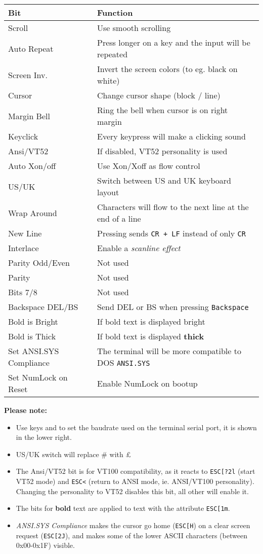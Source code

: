 \begin{tabular}{p{8em} | p{}}
\hline
\textbf{Bit}	& \textbf{Function} \\
\hline
Scroll			& Use smooth scrolling \\
Auto Repeat		& Press longer on a key and the input will be repeated \\
Screen Inv.		& Invert the screen colors (to eg. black on white) \\
Cursor			& Change cursor shape (block / line) \\
\hline
Margin Bell		& Ring the bell when cursor is on right margin \\
Keyclick		& Every keypress will make a clicking sound \\
Ansi/VT52		& If disabled, VT52 personality is used \\
Auto Xon/off	& Use Xon/Xoff as flow control \\
\hline
US/UK			& Switch between US and UK keyboard layout \\
Wrap Around		& Characters will flow to the next line at the end of a line \\
New Line		& Pressing \LKeyEnter{} sends \texttt{CR + LF} instead of only \texttt{CR} \\
Interlace		& Enable a \textit{scanline effect} \\
\hline
Parity Odd/Even	& Not used \\
Parity			& Not used \\
Bits 7/8		& Not used \\
Backspace DEL/BS	& Send DEL or BS when pressing \texttt{Backspace} \\
\hline
Bold is Bright	& If bold text is displayed bright \\
Bold is Thick	& If bold text is displayed \textbf{thick} \\
Set ANSI.SYS Compliance	& The terminal will be more compatible to DOS \texttt{ANSI.SYS} \\
Set NumLock on Reset	& Enable NumLock on bootup \\
\hline
\end{tabular}

\newpage
\textbf{Please note:}
\begin{itemize}[leftmargin=1em]
 \item Use keys  and  to set the baudrate used on the terminal serial port, it is shown in the lower right.
 \item US/UK switch will replace \# with \pounds
 \item The Ansi/VT52 bit is for VT100 compatibility, as it reacts to \texttt{ESC[?2l} (start VT52 mode) and \texttt{ESC<} (return to ANSI mode, 
	ie. ANSI/VT100 personality). Changing the personality to VT52 disables this bit, all other will enable it.
 \item The bits for \textbf{bold} text are applied to text with the attribute \texttt{ESC[1m}.
 \item \textit{ANSI.SYS Compliance} makes the cursor go home (\texttt{ESC[H}) on a clear screen request (\texttt{ESC[2J}),
	and makes some of the lower ASCII characters (between 0x00-0x1F) visible.
\end{itemize}

